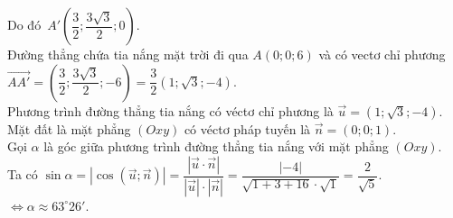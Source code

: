 \begin{ex}
{		Do đó $A'\left(\dfrac{3}{2};\dfrac{3\sqrt{3}}{2};0\right)$.\\
		Đường thẳng chứa tia nắng mặt trời đi qua $A(0;0;6)$ và có vectơ chỉ phương \\ $\overrightarrow{AA'}=\left(\dfrac{3}{2};\dfrac{3\sqrt{3}}{2};-6\right)=\dfrac{3}{2}\left(1;\sqrt{3};-4\right)$.\\
		Phương trình đường thẳng tia nắng có véctơ chỉ phương là $\overrightarrow{u}=\left(1;\sqrt{3};-4\right)$.\\
		Mặt đất là mặt phẳng $\left(Oxy\right)$ có véctơ pháp tuyến là $\overrightarrow{n}=\left(0;0;1\right)$.\\
		Gọi $\alpha $ là góc giữa phương trình đường thẳng tia nắng với mặt phẳng $\left(Oxy\right)$.\\
		Ta có $\sin \alpha 
		=\left| \cos \left(\overrightarrow{u};\overrightarrow{n}\right)\right|
		=\dfrac{\left| \overrightarrow{u} \cdot \overrightarrow{n}\right|}
		{\left| \overrightarrow{u}\right| \cdot \left| \overrightarrow{n}\right|}
		=\dfrac{\left| -4\right|}{\sqrt{1+3+16} \cdot \sqrt{1}}=\dfrac{2}{\sqrt{5}}$.\\
		$\Leftrightarrow \alpha \approx{63^\circ}26'$.}
\end{ex}

